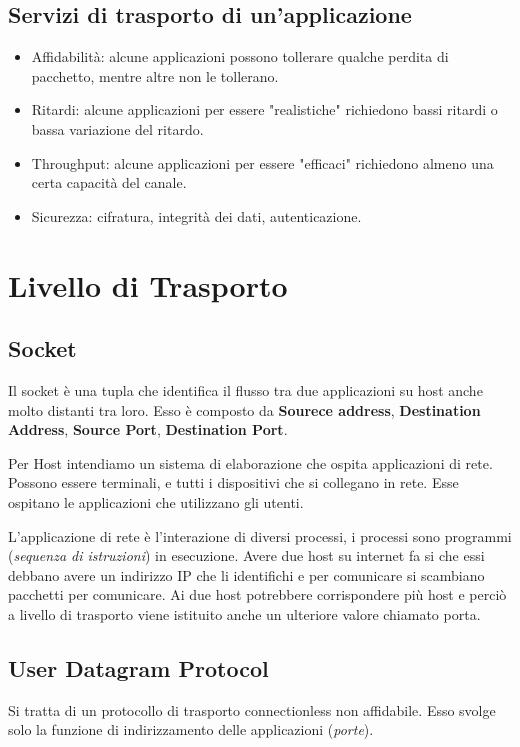 \documentclass[oneside,a4paper,11pt]{book}
\theoremstyle{italicstyle}
\theoremstyle{normStyle}
\begin{document}
\subsection{Servizi di trasporto di un'applicazione}
\begin{itemize}
  \item Affidabilità: alcune applicazioni possono tollerare qualche perdita 
  di pacchetto, mentre altre non le tollerano.
  \item Ritardi: alcune applicazioni per essere "realistiche" richiedono bassi 
  ritardi o bassa variazione del ritardo.
  \item Throughput: alcune applicazioni per essere "efficaci" richiedono almeno una certa 
  capacità del canale.
  \item Sicurezza: cifratura, integrità dei dati, autenticazione.
\end{itemize}
\section{Livello di Trasporto}
\subsection{Socket}
Il socket è una tupla che identifica il flusso tra due
applicazioni su host anche molto distanti tra loro. Esso 
è composto da \textbf{Sourece address}, \textbf{Destination Address},
\textbf{Source Port}, \textbf{Destination Port}.

Per Host intendiamo un sistema di elaborazione che ospita
applicazioni di rete. Possono essere terminali, e tutti i
dispositivi che si collegano in rete. Esse ospitano le
applicazioni che utilizzano gli utenti.

L'applicazione di rete è l'interazione di diversi processi, i processi
sono programmi (\textit{sequenza di istruzioni}) in esecuzione.
Avere due host su internet fa si che essi debbano avere un indirizzo IP che li
identifichi e per comunicare si scambiano pacchetti per comunicare. Ai due host potrebbere
corrispondere più host e perciò a livello di trasporto viene istituito anche 
un ulteriore valore chiamato porta.

\subsection{User Datagram Protocol}
Si tratta di un protocollo di trasporto connectionless non affidabile. Esso
svolge solo la funzione di indirizzamento delle applicazioni (\textit{porte}).
\end{document}
